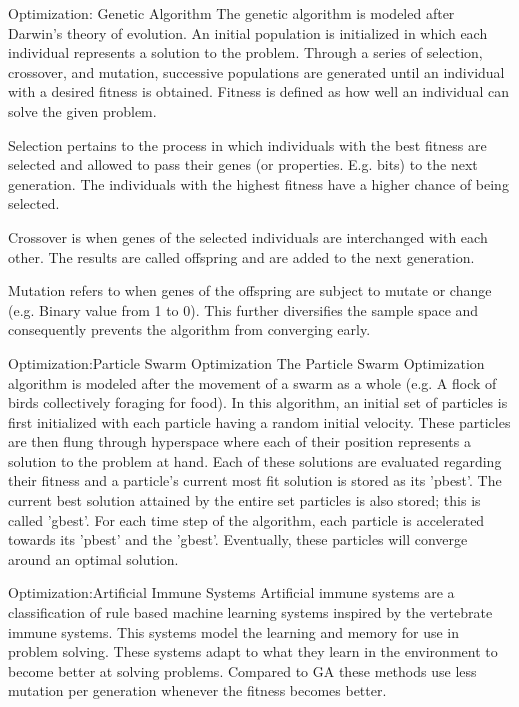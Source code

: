 \documentclass{beamer}
\begin{document}
\begin{frame}{Optimization: Genetic Algorithm}
The genetic algorithm \cite{holland_2010} is modeled after Darwin’s theory of evolution. An initial population is initialized in which each individual represents a solution to the problem. Through a series of selection, crossover, and mutation, successive populations are generated until an individual with a desired fitness is obtained. Fitness is defined as how well an individual can solve the given problem.

Selection pertains to the process in which individuals with the best fitness are selected and allowed to pass their genes (or properties. E.g. bits) to the next generation. The individuals with the highest fitness have a higher chance of being selected.

Crossover is when genes of the selected individuals are interchanged with each other. The results are called offspring and are added to the next generation.

Mutation refers to when genes of the offspring are subject to mutate or change (e.g. Binary value from 1 to 0). This further diversifies the sample space and consequently prevents the algorithm from converging early.
\end{frame}

\begin{frame}{Optimization:Particle Swarm Optimization}
The Particle Swarm Optimization \cite{eberhart_kennedy_1995} algorithm is modeled after the movement of a swarm as a whole (e.g. A flock
of birds collectively foraging for food). In this algorithm, an initial set of particles is first initialized with each
particle having a random initial velocity. These particles are then flung through hyperspace where each of their position
represents a solution to the problem at hand. Each of these solutions are evaluated regarding their fitness and a particle's
current most fit solution is stored as its 'pbest'. The current best solution attained by the entire set particles is also stored; this is called 'gbest'. For each time step of the algorithm, each particle is accelerated towards its 'pbest' and the 'gbest'. Eventually, these particles will converge around an optimal solution.
\end{frame}

\begin{frame}{Optimization:Artificial Immune Systems}
Artificial immune systems are a classification of rule based machine learning systems inspired by the vertebrate immune systems. This systems model the learning and memory for use in problem solving. These systems adapt to what they learn in the environment to become better at solving problems. Compared to GA these methods use less mutation per generation whenever the fitness becomes better.
\end{frame}
\end{document}
